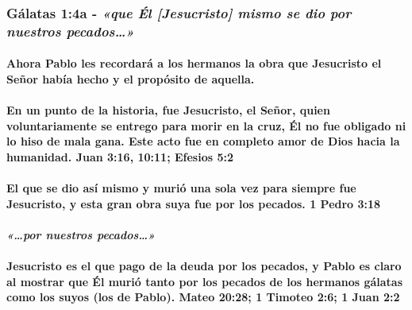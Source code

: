 \documentclass[11a pt,twoside]{article}
\newcommand{\scripture}[1]{%
  {\fontsize{12pt}{16pt}\selectfont\ScriptureFont\itshape #1}%
}
\let\oldsubsubsection\subsubsection
\renewcommand{\subsubsection}{\needspace{4\baselineskip}\oldsubsubsection}
\let\oldparagraph\paragraph
\renewcommand{\paragraph}{\needspace{3\baselineskip}\oldparagraph}
\begin{document}
\subsubsection{\texorpdfstring{Gálatas 1:4a -
\scripture{«que Él [Jesucristo] mismo se dio por nuestros pecados…»}}{Gálatas 1:4a - }}\label{guxe1latas-14a---que-uxe9l-jesucristo-mismo-se-dio-por-nuestros-pecados}

\paragraph{Ahora Pablo les recordará a los hermanos la obra que
Jesucristo el Señor había hecho y el propósito de
aquella.}\label{ahora-pablo-les-recordaruxe1-a-los-hermanos-la-obra-que-jesucristo-el-seuxf1or-habuxeda-hecho-y-el-propuxf3sito-de-aquella.}

\paragraph{En un punto de la historia, fue Jesucristo, el Señor, quien
voluntariamente se entrego para morir en la cruz, Él no fue obligado ni
lo hiso de mala gana. Este acto fue en completo amor de Dios hacia la
humanidad. Juan 3:16, 10:11; Efesios
5:2}\label{en-un-punto-de-la-historia-fue-jesucristo-el-seuxf1or-quien-voluntariamente-se-entrego-para-morir-en-la-cruz-uxe9l-no-fue-obligado-ni-lo-hiso-de-mala-gana.-este-acto-fue-en-completo-amor-de-dios-hacia-la-humanidad.-juan-316-1011-efesios-52}

\paragraph{El que se dio así mismo y murió una sola vez para siempre fue
Jesucristo, y esta gran obra suya fue por los pecados. 1 Pedro
3:18}\label{el-que-se-dio-asuxed-mismo-y-muriuxf3-una-sola-vez-para-siempre-fue-jesucristo-y-esta-gran-obra-suya-fue-por-los-pecados.-1-pedro-318}

\paragraph{\texorpdfstring{\scripture{«…por nuestros pecados…»}}{}}\label{por-nuestros-pecados}

\paragraph{Jesucristo es el que pago de la deuda por los pecados, y
Pablo es claro al mostrar que Él murió tanto por los pecados de los
hermanos gálatas como los suyos (los de Pablo). Mateo 20:28; 1 Timoteo
2:6; 1 Juan
2:2}\label{jesucristo-es-el-que-pago-de-la-deuda-por-los-pecados-y-pablo-es-claro-al-mostrar-que-uxe9l-muriuxf3-tanto-por-los-pecados-de-los-hermanos-guxe1latas-como-los-suyos-los-de-pablo.-mateo-2028-1-timoteo-26-1-juan-22}
\end{document}
